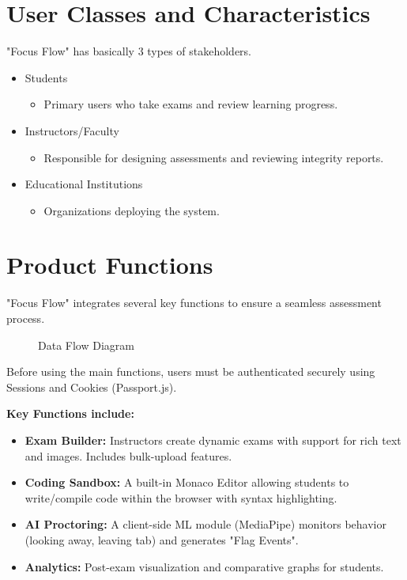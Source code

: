 \documentclass{scrreprt}
\begin{document}
\section{User Classes and Characteristics}
"Focus Flow" has basically 3 types of stakeholders.
\begin{itemize}
  \item Students
    \begin{itemize}
        \item Primary users who take exams and review learning progress.
    \end{itemize}
  \item Instructors/Faculty
    \begin{itemize}
        \item Responsible for designing assessments and reviewing integrity reports.
    \end{itemize}
  \item Educational Institutions
     \begin{itemize}
        \item Organizations deploying the system.
    \end{itemize}
\end{itemize}

\section{Product Functions}
"Focus Flow" integrates several key functions to ensure a seamless assessment process.

\begin{figure}[htbp]
  \centering
  \caption{Data Flow Diagram}
  \label{fig:DFD}
\end{figure}

Before using the main functions, users must be authenticated securely using Sessions and Cookies (Passport.js).

\textbf{Key Functions include:}
\begin{itemize}
    \item \textbf{Exam Builder:} Instructors create dynamic exams with support for rich text and images. Includes bulk-upload features.
    \item \textbf{Coding Sandbox:} A built-in Monaco Editor allowing students to write/compile code within the browser with syntax highlighting.
    \item \textbf{AI Proctoring:} A client-side ML module (MediaPipe) monitors behavior (looking away, leaving tab) and generates "Flag Events".
    \item \textbf{Analytics:} Post-exam visualization and comparative graphs for students.
\end{itemize}
\end{document}
